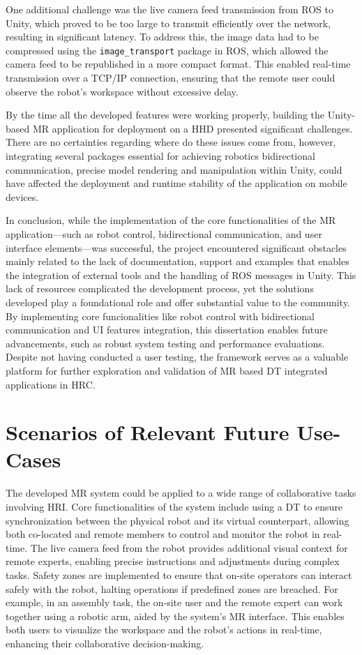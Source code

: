 One additional challenge was the live camera feed transmission from \ac{ROS} to Unity, which proved to be too large to transmit efficiently over the network, resulting in significant latency. To address this, the image data had to be compressed using the \texttt{image\_transport} package in \ac{ROS}, which allowed the camera feed to be republished in a more compact format. This enabled real-time transmission over a \ac{TCP}/\ac{IP} connection, ensuring that the remote user could observe the robot’s workspace without excessive delay.

By the time all the developed features were working properly, building the Unity-based \ac{MR} application for deployment on a \ac{HHD} presented significant challenges. There are no certainties regarding where do these issues come from, however, integrating several packages essential for achieving robotics bidirectional communication, precise model rendering and manipulation within Unity, could have affected the deployment and runtime stability of the application on mobile devices.

In conclusion, while the implementation of the core functionalities of the \ac{MR} application—such as robot control, bidirectional communication, and user interface elements—was successful, the project encountered significant obstacles mainly related to the lack of documentation, support and examples that enables the integration of external tools and the handling of \ac{ROS} messages in Unity. This lack of resources complicated the development process, yet the solutions developed play a foundational role and offer substantial value to the community. By implementing core funcionalities like robot control with bidirectional communication and \ac{UI} features integration, this dissertation enables future advancements, such as robust system testing and performance evaluations. Despite not having conducted a user testing, the framework serves as a valuable platform for further exploration and validation of \ac{MR} based \ac{DT} integrated applications in \ac{HRC}.



\section{Scenarios of Relevant Future Use-Cases}

The developed \ac{MR} system could be applied to a wide range of collaborative tasks involving \ac{HRI}. Core functionalities of the system include using a \ac{DT} to ensure synchronization between the physical robot and its virtual counterpart, allowing both co-located and remote members to control and monitor the robot in real-time. The live camera feed from the robot provides additional visual context for remote experts, enabling precise instructions and adjustments during complex tasks. Safety zones are implemented to ensure that on-site operators can interact safely with the robot, halting operations if predefined zones are breached. For example, in an assembly task, the on-site user and the remote expert can work together using a robotic arm, aided by the system’s \ac{MR} interface. This enables both users to visualize the workspace and the robot’s actions in real-time, enhancing their collaborative decision-making. 

